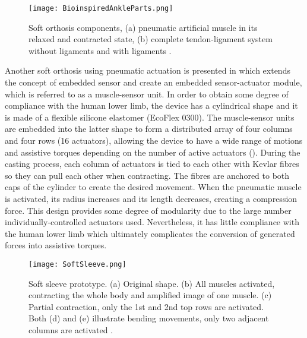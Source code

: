 \begin{figure}[hbt!]
    \centering
    \texttt{[image: BioinspiredAnkleParts.png]}
    \caption[Soft orthosis components, (a) pneumatic artificial muscle in its relaxed and contracted state, (b) complete tendon-ligament system without ligaments and with ligaments.]{Soft orthosis components, (a) pneumatic artificial muscle in its relaxed and contracted state, (b) complete tendon-ligament system without ligaments and with ligaments \cite{park2011bio}. }
    \label{fig:bio_ankle_parts}
\end{figure}

Another soft orthosis using pneumatic actuation is presented in \cite{Park2012} which extends the concept of embedded sensor and create an embedded sensor-actuator module, which is referred to as a muscle-sensor unit. In order to obtain some degree of compliance with the human lower limb, the device has a cylindrical shape and it is made of a flexible silicone elastomer (EcoFlex 0300). The muscle-sensor units are embedded into the latter shape to form a distributed array of four columns and four rows (16 actuators), allowing the device to have a wide range of motions and assistive torques depending on the number of active actuators (). During the casting process, each column of actuators is tied to each other with Kevlar fibres so they can pull each other when contracting. The fibres are anchored to both caps of the cylinder to create the desired movement. When the pneumatic muscle is activated, its radius increases and its length decreases, creating a compression force. This design provides some degree of modularity due to the large number individually-controlled actuators used. Nevertheless, it has little compliance with the human lower limb which ultimately complicates the conversion of generated forces into assistive torques.
\begin{figure}[hbtp!]
    \centering
    \texttt{[image: SoftSleeve.png]}
    \caption[Soft sleeve prototype. (a) Original shape. (b) All muscles activated, contracting the whole body and amplified image of one muscle. (c) Partial contraction, only the 1st and 2nd top rows are activated. Both (d) and (e) illustrate bending movements, only two adjacent columns are activated.]{Soft sleeve prototype. (a) Original shape. (b) All muscles activated, contracting the whole body and amplified image of one muscle. (c) Partial contraction, only the 1st and 2nd top rows are activated. Both (d) and (e) illustrate bending movements, only two adjacent columns are activated \cite{Park2012}. }
    \label{fig:soft_sleeve}
\end{figure}

